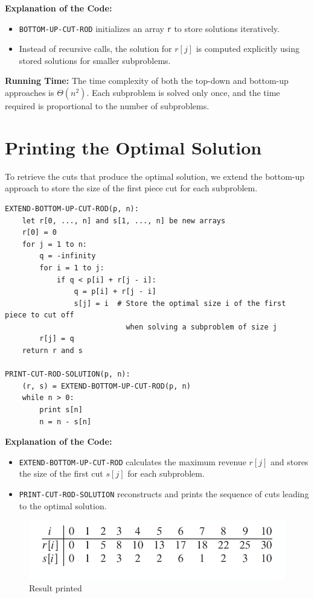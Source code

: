 \textbf{Explanation of the Code:}
\begin{itemize}
    \item \texttt{BOTTOM-UP-CUT-ROD} initializes an array \texttt{r} to store solutions iteratively.
    \item Instead of recursive calls, the solution for \(r[j]\) is computed explicitly using stored solutions for smaller subproblems.
\end{itemize}
\textbf{Running Time:} The time complexity of both the top-down and bottom-up approaches is \(\Theta(n^2)\). Each subproblem is solved only once, and the time required is proportional to the number of subproblems.

\section{Printing the Optimal Solution}
To retrieve the cuts that produce the optimal solution, we extend the bottom-up approach to store the size of the first piece cut for each subproblem.

\begin{verbatim}
EXTEND-BOTTOM-UP-CUT-ROD(p, n):
    let r[0, ..., n] and s[1, ..., n] be new arrays
    r[0] = 0
    for j = 1 to n:
        q = -infinity
        for i = 1 to j:
            if q < p[i] + r[j - i]:
                q = p[i] + r[j - i]
                s[j] = i  # Store the optimal size i of the first piece to cut off 
                            when solving a subproblem of size j
        r[j] = q
    return r and s

PRINT-CUT-ROD-SOLUTION(p, n):
    (r, s) = EXTEND-BOTTOM-UP-CUT-ROD(p, n)
    while n > 0:
        print s[n]
        n = n - s[n]
\end{verbatim}

\textbf{Explanation of the Code:}
\begin{itemize}
    \item \texttt{EXTEND-BOTTOM-UP-CUT-ROD} calculates the maximum revenue \(r[j]\) and stores the size of the first cut \(s[j]\) for each subproblem.
    \item \texttt{PRINT-CUT-ROD-SOLUTION} reconstructs and prints the sequence of cuts leading to the optimal solution.
\end{itemize}

\begin{figure}[h!]
    \centering
    \includegraphics[width=1\linewidth]{immagini//capitolo 13/13_5.png}
    \caption{Result printed}
    \label{fig:enter-label}
\end{figure}

